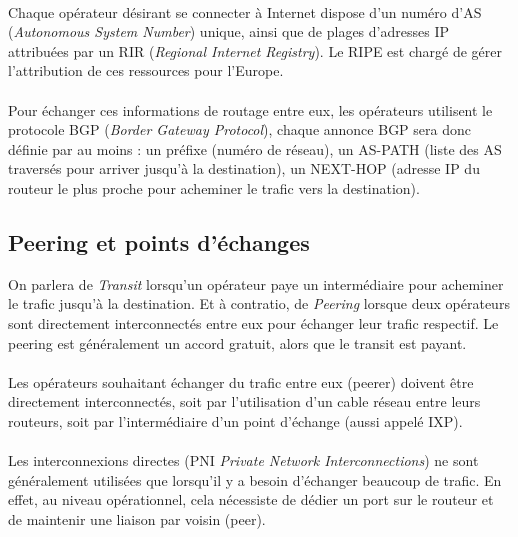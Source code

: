 \paragraph{}
Chaque opérateur désirant se connecter à Internet dispose d'un numéro d'AS (\emph{Autonomous System Number}) unique, ainsi que de plages d'adresses IP attribuées par un RIR (\emph{Regional Internet Registry}). Le RIPE est chargé de gérer l'attribution de ces ressources pour l'Europe.

\paragraph{}
Pour échanger ces informations de routage entre eux, les opérateurs utilisent le protocole BGP (\emph{Border Gateway Protocol}), chaque annonce BGP sera donc définie par au moins : un préfixe (numéro de réseau), un AS-PATH (liste des AS traversés pour arriver jusqu'à la destination), un NEXT-HOP (adresse IP du routeur le plus proche pour acheminer le trafic vers la destination).

\subsection{Peering et points d'échanges}

On parlera de \emph{Transit} lorsqu'un opérateur paye un intermédiaire pour acheminer le trafic jusqu'à la destination.
Et à contratio, de \emph{Peering} lorsque deux opérateurs sont directement interconnectés entre eux pour échanger leur trafic respectif. Le peering est généralement un accord gratuit, alors que le transit est payant.

\paragraph{}
Les opérateurs souhaitant échanger du trafic entre eux (peerer) doivent être directement interconnectés, soit par l'utilisation d'un cable réseau entre leurs routeurs, soit par l'intermédiaire d'un point d'échange (aussi appelé IXP).

\paragraph{}
Les interconnexions directes (PNI \emph{Private Network Interconnections}) ne sont généralement utilisées que lorsqu'il y a besoin d'échanger beaucoup de trafic. En effet, au niveau opérationnel, cela nécessiste de dédier un port sur le routeur et de maintenir une liaison par voisin (peer).


